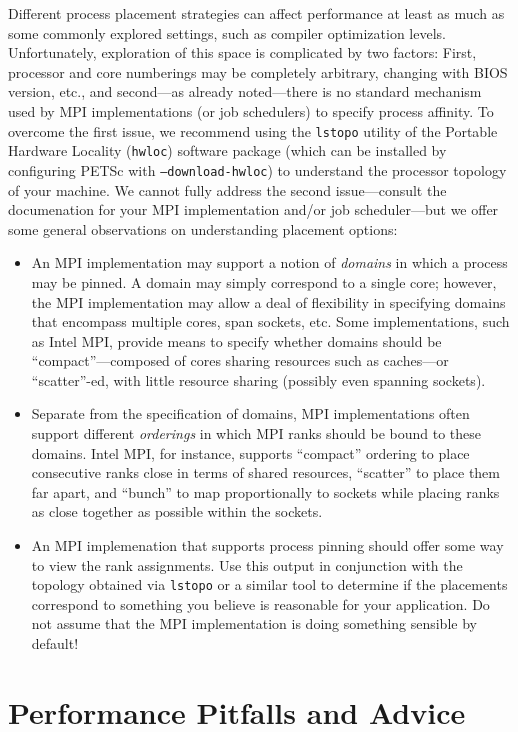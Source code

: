 {{Different process placement strategies can affect performance at least as much as some commonly explored settings,
such as compiler optimization levels.
Unfortunately, exploration of this space is complicated by two factors:
First, processor and core numberings may be completely arbitrary, changing with BIOS version, etc., and second---as
already noted---there is no standard mechanism used by MPI implementations (or job schedulers) to specify
process affinity.
To overcome the first issue, we recommend using the \texttt{lstopo} utility of the Portable Hardware Locality
(\texttt{hwloc}) software package (which can be installed by configuring PETSc with \texttt{--download-hwloc}) to
understand the processor topology of your machine.
We cannot fully address the second issue---consult the documenation for your MPI implementation and/or job
scheduler---but we offer some general observations on understanding placement options:
\begin{itemize}
\item An MPI implementation may support a notion of {\it domains} in which a process may be pinned.
  A domain may simply correspond to a single core; however, the MPI implementation may allow a deal of flexibility
  in specifying domains that encompass multiple cores, span sockets, etc.
  Some implementations, such as Intel MPI, provide means to specify whether domains should be ``compact''---composed
  of cores sharing resources such as caches---or ``scatter''-ed, with little resource sharing (possibly even spanning
  sockets).
\item Separate from the specification of domains, MPI implementations often support different {\it orderings} in which MPI
  ranks should be bound to these domains. Intel MPI, for instance, supports
  ``compact'' ordering to place consecutive ranks close in terms of shared resources, ``scatter''
  to place them far apart, and ``bunch'' to map proportionally to sockets while placing ranks as close together as
  possible within the sockets.
\item An MPI implemenation that supports process pinning should offer some way to view the rank assignments.
  Use this output in conjunction with the topology obtained via \texttt{lstopo} or a similar tool to determine if the
  placements correspond to something you believe is reasonable for your application.
  Do not assume that the MPI implementation is doing something sensible by default!
\end{itemize}

\section{Performance Pitfalls and Advice}

}}
